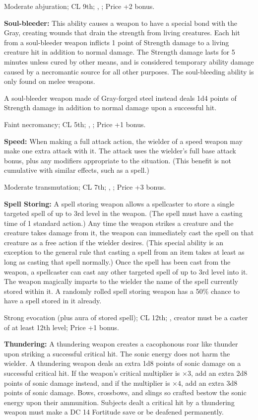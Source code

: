 Moderate abjuration; CL 9th; , ; Price +2 bonus.

\textbf{Soul-bleeder:} This ability causes a weapon to have a special bond with the Gray, creating wounds that drain the strength from living creatures. Each hit from a soul-bleeder weapon inflicts 1 point of Strength damage to a living creature hit in addition to normal damage. The Strength damage lasts for 5 minutes unless cured by other means, and is considered temporary ability damage caused by a necromantic source for all other purposes. The soul-bleeding ability is only found on melee weapons.

A soul-bleeder weapon made of Gray-forged steel instead deals 1d4 points of Strength damage in addition to normal damage upon a successful hit.

Faint necromancy; CL 5th; , ; Price +1 bonus.

\textbf{Speed:} When making a full attack action, the wielder of a speed weapon may make one extra attack with it. The attack uses the wielder's full base attack bonus, plus any modifiers appropriate to the situation. (This benefit is not cumulative with similar effects, such as a  spell.)

Moderate transmutation; CL 7th; , ; Price +3 bonus.

\textbf{Spell Storing:} A spell storing weapon allows a spellcaster to store a single targeted spell of up to 3rd level in the weapon. (The spell must have a casting time of 1 standard action.) Any time the weapon strikes a creature and the creature takes damage from it, the weapon can immediately cast the spell on that creature as a free action if the wielder desires. (This special ability is an exception to the general rule that casting a spell from an item takes at least as long as casting that spell normally.) Once the spell has been cast from the weapon, a spellcaster can cast any other targeted spell of up to 3rd level into it. The weapon magically imparts to the wielder the name of the spell currently stored within it. A randomly rolled spell storing weapon has a 50\% chance to have a spell stored in it already.

Strong evocation (plus aura of stored spell); CL 12th; , creator must be a caster of at least 12th level; Price +1 bonus.

\textbf{Thundering:} A thundering weapon creates a cacophonous roar like thunder upon striking a successful critical hit. The sonic energy does not harm the wielder. A thundering weapon deals an extra 1d8 points of sonic damage on a successful critical hit. If the weapon's critical multiplier is $\times3$, add an extra 2d8 points of sonic damage instead, and if the multiplier is $\times4$, add an extra 3d8 points of sonic damage. Bows, crossbows, and slings so crafted bestow the sonic energy upon their ammunition. Subjects dealt a critical hit by a thundering weapon must make a DC 14 Fortitude save or be deafened permanently.

